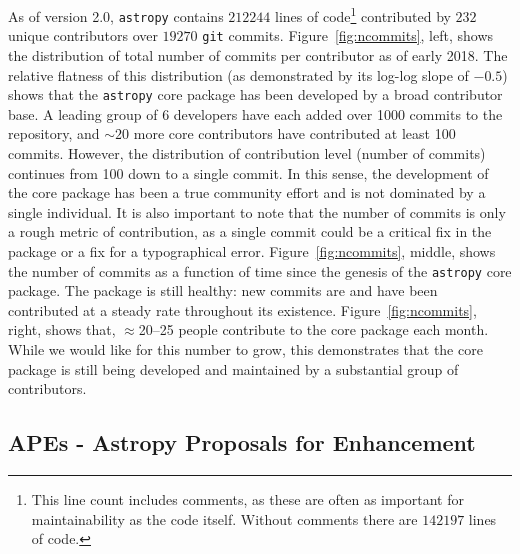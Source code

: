 \documentclass[modern]{aastex62}
\newcommand{\package}[1]{\texttt{#1}\xspace}
\newcommand{\astropypkg}{\package{astropy}}
\renewcommand{\figurename}{Figure\xspace}
\begin{document}
As of version 2.0, \astropypkg contains $212244$ lines of code\footnote{This
line count includes comments, as these are often as important for
maintainability as the code itself.  Without comments there are $142197$ lines
of code.} contributed by $232$ unique contributors over $19270$ \texttt{git}
commits.
\figurename~\ref{fig:ncommits}, left, shows the distribution of total number of
commits per contributor as of early 2018.
The relative flatness of this distribution (as demonstrated by its log-log slope of
$-0.5$) shows that the \astropypkg core package has been developed by a broad
contributor base.  A leading group of 6 developers have each added over 1000
commits to the repository, and $\sim 20$ more core contributors have contributed
at least 100 commits.
However, the distribution of contribution level (number of commits) continues
from 100 down to a single commit.
In this sense, the development of the core package has been a true community
effort and is not dominated by a single individual.
It is also important to note that the number of commits is only a rough metric
of contribution, as a single commit could be a critical fix in the package or a
fix for a typographical error.
\figurename~\ref{fig:ncommits}, middle, shows the number of commits as a
function of time since the genesis of the \astropypkg core package.
The package is still healthy: new commits are and have been contributed at a
steady rate throughout its existence.
\figurename~\ref{fig:ncommits}, right, shows that, $\approx$20--25 people
contribute to the core package each month.
While we would like for this number to grow, this demonstrates that the core
package is still being developed and maintained by a substantial group of
contributors.

\subsection{APEs - Astropy Proposals for Enhancement}
\end{document}
